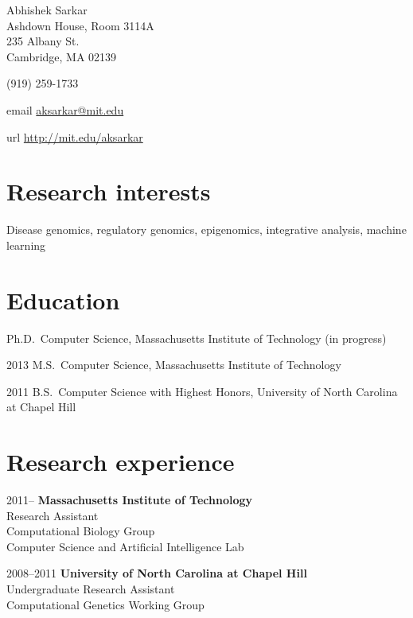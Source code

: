 \documentclass{article}
\begin{document}
{\LARGE Abhishek Sarkar\vspace{1em}}\\
Ashdown House, Room 3114A\\
235 Albany St.\\
Cambridge, MA 02139\vspace{1em}

(919) 259-1733\vspace{1em}

\begin{hdesc}
\item[email] \url{aksarkar@mit.edu}
\item[url] \url{http://mit.edu/aksarkar}
\end{hdesc}

\section*{Research interests}
Disease genomics, regulatory genomics, epigenomics, integrative analysis,
machine learning

\section*{Education}
\begin{hdesc}
\item[] Ph.D.\ Computer Science, Massachusetts Institute of Technology (in
  progress)
\item[2013] M.S.\ Computer Science, Massachusetts Institute of Technology
\item[2011] B.S.\ Computer Science with Highest Honors, University of North
  Carolina at Chapel Hill
\end{hdesc}

\section*{Research experience}
\begin{hdesc}[itemsep=1em]
\item[2011--] \textbf{Massachusetts Institute of Technology}\\
Research Assistant\\
Computational Biology Group\\
Computer Science and Artificial Intelligence Lab

\item[2008--2011] \textbf{University of North Carolina at Chapel Hill}\\
Undergraduate Research Assistant\\
Computational Genetics Working Group
\end{hdesc}
\end{document}
